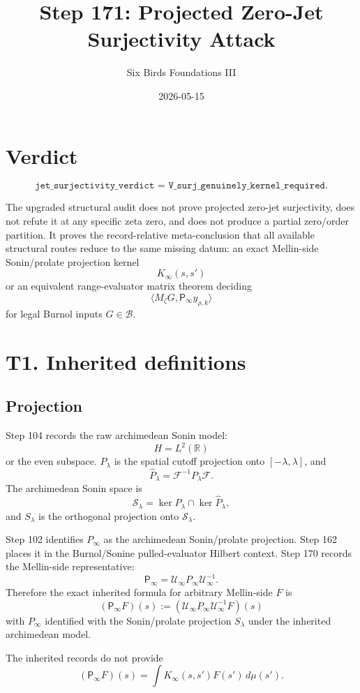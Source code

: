 \documentclass[11pt]{article}
\title{Step 171: Projected Zero-Jet Surjectivity Attack}
\author{Six Birds Foundations III}
\date{2026-05-15}
\newcommand{\Psym}{\mathsf P_\infty}
\newcommand{\Mz}{M_\zeta}
\newcommand{\Uinf}{\mathcal U_\infty}
\newcommand{\Blegal}{\mathcal B}
\begin{document}
\maketitle

\section{Verdict}

\[
\boxed{\texttt{jet\_surjectivity\_verdict =
V\_surj\_genuinely\_kernel\_required}.}
\]

The upgraded structural audit does not prove projected zero-jet surjectivity,
does not refute it at any specific zeta zero, and does not produce a partial
zero/order partition.  It proves the record-relative meta-conclusion that all
available structural routes reduce to the same missing datum: an exact
Mellin-side Sonin/prolate projection kernel
\[
  K_\infty(s,s')
\]
or an equivalent range-evaluator matrix theorem deciding
\[
  \langle \Mz G,\Psym y_{\rho,k}\rangle
\]
for legal Burnol inputs \(G\in\Blegal\).

\section{T1. Inherited definitions}

\subsection*{Projection}

Step 104 records the raw archimedean Sonin model:
\[
  H=L^2(\mathbb R)
\]
or the even subspace. \(P_\lambda\) is the spatial cutoff projection onto
\([-\lambda,\lambda]\), and
\[
  \widehat P_\lambda=\mathcal F^{-1}P_\lambda\mathcal F.
\]
The archimedean Sonin space is
\[
  \mathcal S_\lambda=\ker P_\lambda\cap\ker\widehat P_\lambda,
\]
and \(S_\lambda\) is the orthogonal projection onto \(\mathcal S_\lambda\).

Step 102 identifies \(P_\infty\) as the archimedean Sonin/prolate projection.
Step 162 places it in the Burnol/Sonine pulled-evaluator Hilbert context.
Step 170 records the Mellin-side representative:
\[
  \Psym=\Uinf P_\infty\Uinf^{-1}.
\]
Therefore the exact inherited formula for arbitrary Mellin-side \(F\) is
\[
  \boxed{
  (\Psym F)(s)
  :=
  (\Uinf P_\infty\Uinf^{-1}F)(s)
  }
\]
with \(P_\infty\) identified with the Sonin/prolate projection \(S_\lambda\)
under the inherited archimedean model.

The inherited records do not provide
\[
  (\Psym F)(s)=\int K_\infty(s,s')F(s')\,d\mu(s').
\]
\end{document}
